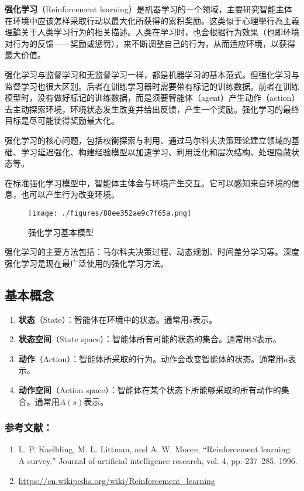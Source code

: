 
\textbf{强化学习}（Reinforcement learning）是机器学习的一个领域，主要研究智能主体在环境中应该怎样采取行动以最大化所获得的累积奖励。这类似于心理學行為主義理論关于人类学习行为的相关描述。人类在学习时，也会根据行为效果（也即环境对行为的反馈——奖励或惩罚），来不断调整自己的行为，从而适应环境，以获得最大价值。

强化学习与监督学习和无监督学习一样，都是机器学习的基本范式。但强化学习与监督学习也很大区别。后者在训练学习器时需要带有标记的训练数据。前者在训练模型时，没有做好标记的训练数据，而是须要智能体（agent）产生动作（action）去主动探索环境，环境状态发生改变并给出反馈，产生一个奖励。强化学习的最终目标是尽可能使得奖励最大化。

强化学习的核心问题，包括权衡探索与利用、通过马尔科夫决策理论建立领域的基础、学习延迟强化、构建经验模型以加速学习、利用泛化和层次结构、处理隐藏状态等。

在标准强化学习模型中，智能体主体会与环境产生交互。它可以感知来自环境的信息，也可以产生行为改变环境。

\begin{figure}[ht]
\centering
\texttt{[image: ./figures/88ee352ae9c7f65a.png]}
\caption{强化学习基本模型} \label{fig_rl_1}
\end{figure}

强化学习的主要方法包括：马尔科夫决策过程、动态规划、时间差分学习等。深度强化学习是现在最广泛使用的强化学习方法。

\subsection{基本概念}

\begin{enumerate}
\item \textbf{状态}（State）：智能体在环境中的状态。通常用$s$表示。
\item \textbf{状态空间}（State space）：智能体所有可能的状态的集合。通常用$S$表示。
\item \textbf{动作}（Action）：智能体所采取的行为。动作会改变智能体的状态。通常用$a$表示。
\item \textbf{动作空间}（Action space）：智能体在某个状态下所能够采取的所有动作的集合。通常用$A(s)$表示。
\end{enumerate}



\subsubsection{参考文献：}
\begin{enumerate}
\item L. P. Kaelbling, M. L. Littman, and A. W. Moore, “Reinforcement learning: A survey,” Journal of artificial intelligence research, vol. 4, pp. 237–285, 1996.
\item \href{https://en.wikipedia.org/wiki/Reinforcement\%5C_learning}{https://en.wikipedia.org/wiki/Reinforcement\_learning}
\end{enumerate}
